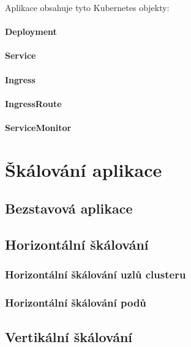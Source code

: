 \documentclass[thesis=M,czech]{FITthesis}[2019/12/23]
\theoremstyle{plain}
\theoremstyle{definition}
\begin{document}
Aplikace obsahuje tyto Kubernetes objekty:

\paragraph{Deployment}
\paragraph{Service}
\paragraph{Ingress}
\paragraph{IngressRoute}
\paragraph{ServiceMonitor}

\section{Škálování aplikace}


\subsection{Bezstavová aplikace}


\subsection{Horizontální škálování}
\subsubsection{Horizontální škálování uzlů clusteru}
\subsubsection{Horizontální škálování podů}

\subsection{Vertikální škálování}
\end{document}
